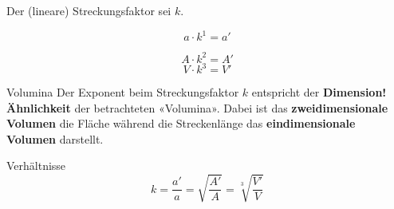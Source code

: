 \begin{gesetz}{}{}
  Der (lineare) Streckungsfaktor sei $k$.

  $$a \cdot{} k^1 = a'$$

  $$A \cdot{} k^2 = A'$$
  $$V \cdot{} k^3 = V'$$
\end{gesetz}

\begin{bemerkung}{Volumina}{}
Der Exponent beim Streckungsfaktor $k$ entspricht der \textbf{Dimension!Ähnlichkeit} der
betrachteten «Volumina». Dabei ist das \textbf{zweidimensionale Volumen} die
Fläche während die Streckenlänge das \textbf{eindimensionale Volumen} darstellt.
\end{bemerkung}

\begin{bemerkung}{Verhältnisse}{}
  $$k = \frac{a'}{a} = \sqrt{\frac{A'}{A}} = \sqrt[3\,\,\,]{\frac{V'}{V}}$$
\end{bemerkung}

  
\newpage
